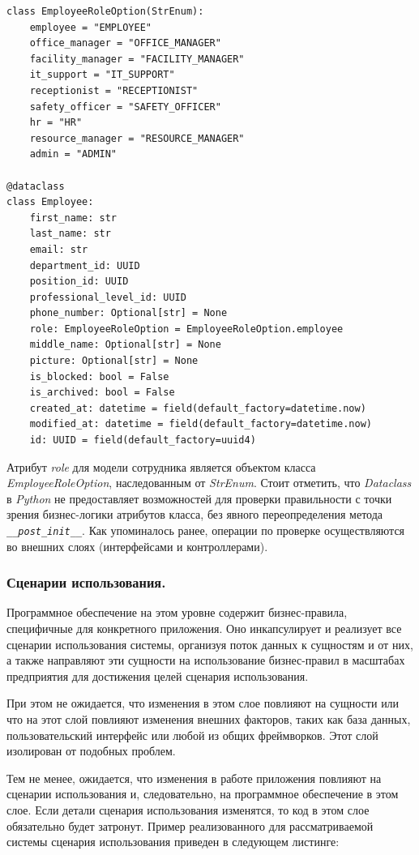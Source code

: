 \begin{lstlisting}[style=pythonstyle]
class EmployeeRoleOption(StrEnum):
    employee = "EMPLOYEE"
    office_manager = "OFFICE_MANAGER"
    facility_manager = "FACILITY_MANAGER"
    it_support = "IT_SUPPORT"
    receptionist = "RECEPTIONIST"
    safety_officer = "SAFETY_OFFICER"
    hr = "HR"
    resource_manager = "RESOURCE_MANAGER"
    admin = "ADMIN"

@dataclass
class Employee:
    first_name: str
    last_name: str
    email: str
    department_id: UUID
    position_id: UUID
    professional_level_id: UUID
    phone_number: Optional[str] = None
    role: EmployeeRoleOption = EmployeeRoleOption.employee
    middle_name: Optional[str] = None
    picture: Optional[str] = None
    is_blocked: bool = False
    is_archived: bool = False
    created_at: datetime = field(default_factory=datetime.now)
    modified_at: datetime = field(default_factory=datetime.now)
    id: UUID = field(default_factory=uuid4)
\end{lstlisting}

Атрибут \textit{role} для модели сотрудника является объектом класса \textit{Employee\-Role\-Option}, наследованным от \textit{StrEnum}. Стоит отметить, что \textit{Dataclass} в \textit{Python} не предоставляет возможностей для проверки правильности с точки зрения бизнес-логики атрибутов класса, без явного переопределения метода \textit{\lstinline!__post_init__!}. Как упоминалось ранее, операции по проверке осуществляются во внешних слоях (интерфейсами и контроллерами).

\subsubsection{Сценарии использования. }

Программное обеспечение на этом уровне содержит бизнес-правила, специфичные для конкретного приложения. Оно инкапсулирует и реализует все сценарии использования системы, организуя поток данных к сущностям и от них, а также направляют эти сущности на использование бизнес-правил в масштабах предприятия для достижения целей сценария использования.

При этом не ожидается, что изменения в этом слое повлияют на сущности или что на этот слой повлияют изменения внешних факторов, таких как база данных, пользовательский интерфейс или любой из общих фреймворков. Этот слой изолирован от подобных проблем.

Тем не менее, ожидается, что изменения в работе приложения повлияют на сценарии использования и, следовательно, на программное обеспечение в этом слое. Если детали сценария использования изменятся, то код в этом слое обязательно будет затронут. Пример реализованного для рассматриваемой системы сценария использования приведен в следующем листинге:

